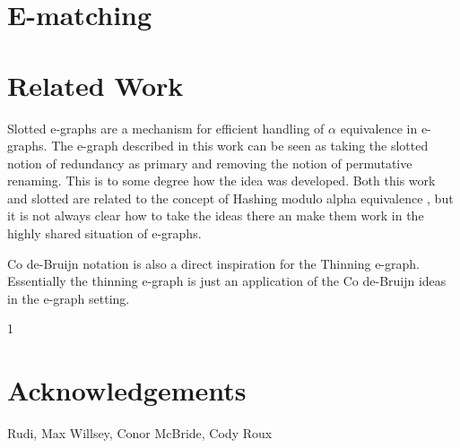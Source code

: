 \documentclass{article}%
\begin{document}

\section{E-matching}

\section{Related Work}

Slotted e-graphs \cite{slotted} are a mechanism for efficient handling of $\alpha$ equivalence in e-graphs. The e-graph described in this work can be seen as taking the slotted notion of redundancy as primary and removing the notion of permutative renaming. This is to some degree how the idea was developed. Both this work and slotted are related to the concept of Hashing modulo alpha equivalence \cite{hashalpha}, but it is not always clear how to take the ideas there an make them work in the highly shared situation of e-graphs.

Co de-Bruijn notation \cite{McBride_2018} is also a direct inspiration for the Thinning e-graph. Essentially the thinning e-graph is just an application of the Co de-Bruijn ideas in the e-graph setting.

\begin{thebibliography}{1}


\end{thebibliography}

\section{Acknowledgements}
Rudi, Max Willsey, Conor McBride, Cody Roux
\end{document}
